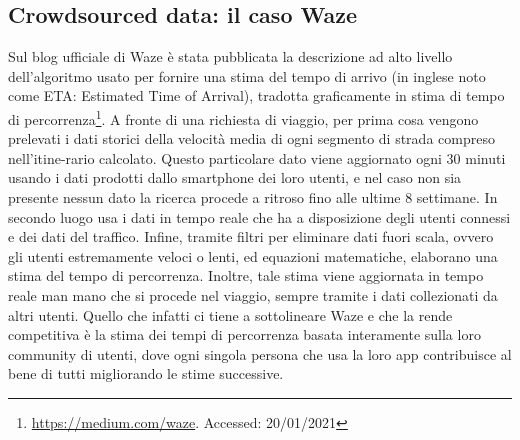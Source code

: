 \subsection{Crowdsourced data: il caso Waze}

Sul blog ufficiale di Waze è stata pubblicata la descrizione ad alto livello dell'algoritmo usato per fornire una stima del tempo di arrivo (in inglese noto come ETA: Estimated Time of Arrival), tradotta graficamente in stima di tempo di percorrenza\footnote{\url{https://medium.com/waze}. Accessed: 20/01/2021}. A fronte di una richiesta di viaggio, per prima cosa vengono prelevati i dati storici della velocità media di ogni segmento di strada compreso nell'itine-rario calcolato. Questo particolare dato viene aggiornato ogni 30 minuti usando i dati prodotti dallo smartphone dei loro utenti, e nel caso non sia presente nessun dato la ricerca procede a ritroso fino alle ultime 8 settimane. In secondo luogo usa i dati in tempo reale che ha a disposizione degli utenti connessi e dei dati del traffico. Infine, tramite filtri per eliminare dati fuori scala, ovvero gli utenti estremamente veloci o lenti, ed equazioni matematiche, elaborano una stima del tempo di percorrenza. Inoltre, tale stima viene aggiornata in tempo reale man mano che si procede nel viaggio, sempre tramite i dati collezionati da altri utenti. Quello che infatti ci tiene a sottolineare Waze e che la rende competitiva è la stima dei tempi di percorrenza basata interamente sulla loro community di utenti, dove ogni singola persona che usa la loro app contribuisce al bene di tutti migliorando le stime successive.

























